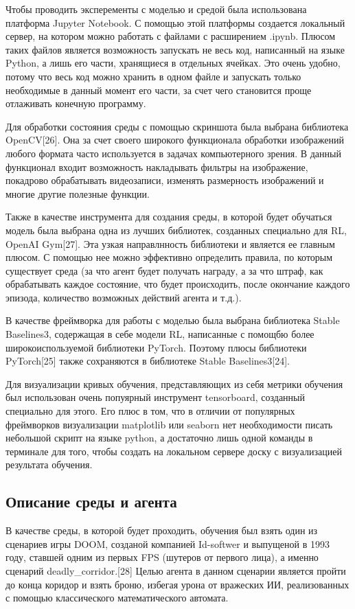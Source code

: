 \documentclass[bachelor, och, coursework]{shiza}
\begin{document}
Чтобы проводить эксперементы с моделью и средой была использована платформа Jupyter Notebook. С помощью этой платформы создается локальный сервер, на котором можно работать
с файлами с расширением .ipynb. Плюсом таких файлов является возможность запускать не весь код, написанный на языке Python, а лишь его части, хранящиеся в отдельных ячейках.
Это очень удобно, потому что весь код можно хранить в одном файле и запускать только необходимые в данный момент его части, за счет чего становится проще отлаживать конечную программу.

Для обработки состояния среды с помощью скриншота была выбрана библиотека OpenCV[26]. Она за счет своего широкого функционала обработки изображений любого формата часто используется
в задачах компьютерного зрения. В данный функционал входит возможность накладывать фильтры на изображение, покадрово обрабатывать видеозаписи, изменять размерность изображений и
многие другие полезные функции.

Также в качестве инструмента для создания среды, в которой будет обучаться модель была выбрана одна из лучших библиотек, созданных специально для RL, OpenAI Gym[27]. Эта
узкая направлнность библиотеки и является ее главным плюсом. С помощью нее можно эффективно определить правила, по которым существует среда (за что агент будет получать
награду, а за что штраф, как обрабатывать каждое состояние, что будет происходить, после окончание каждого эпизода, количество возможных действий агента и т.д.).

В качестве фреймворка для работы с моделью была выбрана библиотека Stable Baselines3, содержащая в себе модели RL, написанные с помощбю более широкоиспользуемой библиотеки PyTorch.
Поэтому плюсы библиотеки PyTorch[25] также сохраняются в библиотеке Stable Baselines3[24].

Для визуализации кривых обучения, представляющих из себя метрики обучения был использован очень попуярный инструмент tensorboard, созданный специально для этого. Его плюс в том,
что в отличии от популярных фреймворков визуализации matplotlib или seaborn нет необходимости писать небольшой скрипт на языке python, а достаточно лишь одной команды в терминале
для того, чтобы создать на локальном сервере доску с визуализацией результата обучения.

\subsection{Описание среды и агента}
В качестве среды, в которой будет проходить, обучения был взять один из сценариев игры DOOM, созданой компанией Id-softwer и выпущеной в 1993 году, ставшей одним из первых FPS
(шутеров от первого лица), а именно сценарий deadly_corridor.[28] Целью агента в данном сценарии является пройти до конца коридор и взять броню, избегая урона от вражеских ИИ, реализованных
с помощью классического математического автомата.
\end{document}
